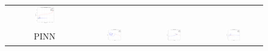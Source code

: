 \documentclass[11pt,a4paper, twocolumn]{article}
\begin{document}
\begin{figure}[H]
\begin{tabular}{cccc}
      \includegraphics[width=0.27\textwidth]{../inference_results/test/LSTM/three_body/500/full_trajectory_spaceship_0.png} \\
      PINN &
      \includegraphics[width=0.27\textwidth]{../inference_results/train/PINN/three_body/500/full_trajectory_spaceship_0.png} &
      \includegraphics[width=0.27\textwidth]{../inference_results/val/PINN/three_body/500/full_trajectory_spaceship_0.png} &
      \includegraphics[width=0.27\textwidth]{../inference_results/test/PINN/three_body/500/full_trajectory_spaceship_0.png}
  \end{tabular}
\end{figure}
\end{document}
